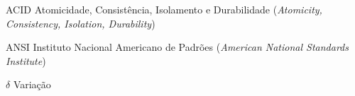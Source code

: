\listoffigures*
\cleardoublepage


\listoftables*
\cleardoublepage


\begin{siglas}
    \item[ACID] Atomicidade, Consistência, Isolamento e Durabilidade (\textit{\foreignlanguage{english}{Atomicity, Consistency, Isolation, Durability}})
    \item[ANSI] Instituto Nacional Americano de Padrões (\textit{\foreignlanguage{english}{American National Standards Institute}})
\end{siglas}

\begin{simbolos}
  \item[$ \delta $] Variação
\end{simbolos}
